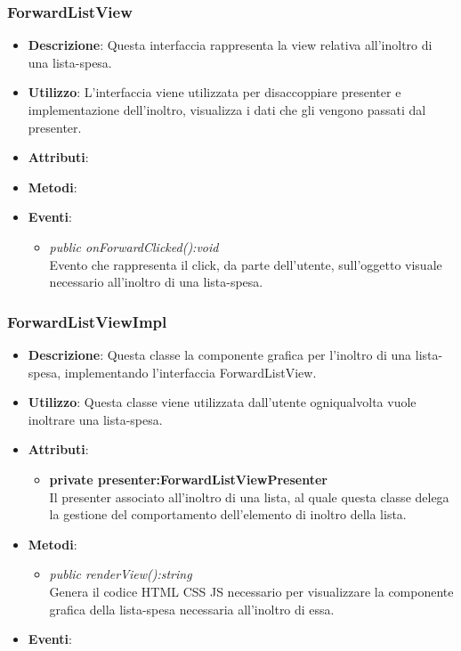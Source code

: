 \subsubsection{ForwardListView}
\begin{itemize}
\item \textbf{Descrizione}: Questa interfaccia rappresenta la view relativa all'inoltro di una lista-spesa.
\item \textbf{Utilizzo}: L'interfaccia viene utilizzata per disaccoppiare presenter e implementazione dell'inoltro, visualizza i dati che gli vengono passati dal presenter.
\item \textbf{Attributi}: 
\item \textbf{Metodi}:
\item \textbf{Eventi}:
\begin{itemize}
\item \textit{public onForwardClicked():void}\\
	Evento che rappresenta il click, da parte dell'utente, sull'oggetto visuale necessario all'inoltro di una lista-spesa.
\end{itemize}
\end{itemize}

\subsubsection{ForwardListViewImpl}
\begin{itemize}
\item \textbf{Descrizione}: Questa classe la componente grafica per l'inoltro di una lista-spesa, implementando l'interfaccia ForwardListView.
\item \textbf{Utilizzo}: Questa classe viene utilizzata dall'utente ogniqualvolta vuole inoltrare una lista-spesa.
\item \textbf{Attributi}:
\begin{itemize}
\item \textbf{private presenter:ForwardListViewPresenter}\\
Il presenter associato all'inoltro di una lista, al quale questa classe delega la gestione del comportamento dell'elemento di inoltro della lista.
\end{itemize}
\item \textbf{Metodi}: 
	\begin{itemize}
	\item \textit{public renderView():string}\\
		Genera il codice HTML CSS JS necessario per visualizzare la componente grafica della lista-spesa necessaria all'inoltro di essa.
	\end{itemize}
\item \textbf{Eventi}:
\end{itemize}

